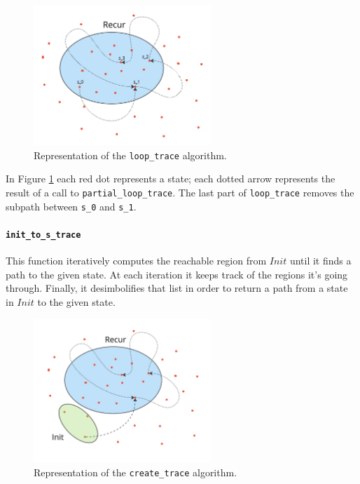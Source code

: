 \documentclass[12pt]{article}
\begin{document}
    \begin{figure}[H] 
        \centering
        \includegraphics[width=0.6\textwidth]{loop_trace.jpg}
        \caption{Representation of the \texttt{loop\_trace} algorithm.}
        \label{fig:loop_trace}
    \end{figure}
   
    In Figure \ref{fig:loop_trace} each red dot represents a state; each dotted arrow represents the result of a call to \texttt{partial\_loop\_trace}.
    The last part of \texttt{loop\_trace} removes the subpath between \texttt{s\_0} and \texttt{s\_1}.

    \paragraph*{\texttt{init\_to\_s\_trace}}
    This function iteratively computes the reachable region from $Init$ until it finds a path to the given state.
    At each iteration it keeps track of the regions it's going through.
    Finally, it desimbolifies that list in order to return a path from a state in $Init$ to the given state.

    \begin{figure}[H] 
        \centering
        \includegraphics[width=0.6\textwidth]{create_trace.jpg}
        \caption{Representation of the \texttt{create\_trace} algorithm.}
        \label{fig:create_trace}
    \end{figure}
\end{document}
